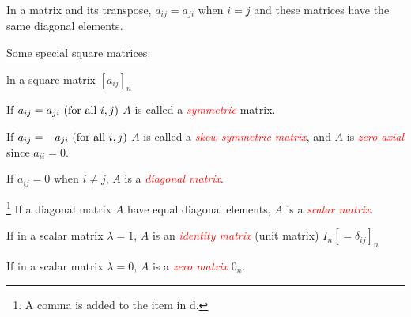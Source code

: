 \documentclass{article}
\begin{document}
\hNewLine					%
In a matrix and its transpose, $a_{ij} = a_{ji}$ when $i = j$ and these
matrices have the same diagonal elements. 

\underline{Some special square matrices}:

ln a square matrix $[a_{ij}]_{n}$
\begin{hEnumerateAlpha}

	\item
	
	If $a_{ij} = a_{ji} \text{\space} (\text{for all } i, j)$ $A$ is called a \textcolor{red}{\textit{symmetric}} matrix.
	 
	\item
	
	If $a_{ij} = -a_{ji} \text{\space} (\text{for all } i, j)$ $A$ is called a \textcolor{red}{\textit{skew symmetric matrix}}, and $A$ is \textcolor{red}{\textit{zero axial}} since $a_{ii} = 0$.
	
	\item
	
	If $a_{ij} = 0$ when  $i \neq j$, $A$ is a \textcolor{red}{\textit{diagonal matrix}}.
	
	\item
	
	\footnote{A comma is added to the item in d.}
	If a diagonal matrix  $A$ have equal diagonal elements, $A$ is a \textcolor{red}{\textit{scalar matrix}}.
	
	\item
	
	If in a scalar matrix $\lambda = 1$,  $A$ is an \textcolor{red}{\textit{identity matrix}} (unit matrix) $I_{n}[=\delta_{ij}]_{n}$
	
	\item
	
	If in a scalar matrix $\lambda = 0$,  $A$ is a \textcolor{red}{\textit{zero matrix}} $0_{n}$.

\end{hEnumerateAlpha}
\end{document}
